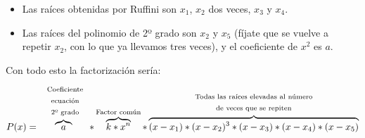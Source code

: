\documentclass[a4paper,11pt,answers]{exam}
\begin{document}
\begin{enumerate}
\begin{itemize}
  \item Las raíces obtenidas por Ruffini son $x_1$, $x_2$  dos veces, $x_3$ y $x_4$.
  \item Las raíces del polinomio de 2º grado son $x_2$ y $x_5$ (fíjate que se vuelve a repetir $x_2$, con lo que ya llevamos tres veces), y el coeficiente de $x^2$ es $a$.
  \end{itemize}
  Con todo esto la factorización sería:
  \[P(x) = \overbrace{a}^{\
      \begin{array}{c}
        \text{\scriptsize{Coeficiente}}\\
        \text{\scriptsize{ecuación}}\\
        \text{\scriptsize{2º grado}}
      \end{array}
    }*
    \overbrace{k*x^n}^{\text{\scriptsize Factor común}}*
    \overbrace{(x-x_1)*(x-x_2)^3*(x-x_3)*(x-x_4)*(x-x_5)}^{
      \begin{array}{c}
        \text{\scriptsize Todas las raíces elevadas al número}\\
        \text{\scriptsize de veces que se repiten}
      \end{array}}
  \]
\end{enumerate}
\end{document}
